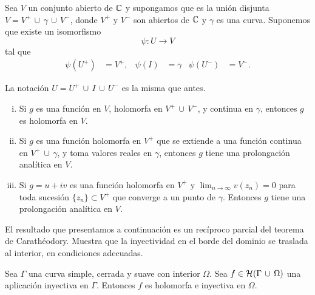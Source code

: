 \begin{theorem} Sea $V$ un conjunto abierto de $\mathbb{C}$ y supongamos que es la unión disjunta $V = V^+ \, \cup \, \gamma \, \cup \, V^-$, donde $V^+$ y $V^-$ son abiertos de $\mathbb{C}$ y $\gamma$ es una curva. Suponemos que existe un isomorfismo
    \begin{equation*}
        \psi: U \to V
    \end{equation*}
    tal que
    \begin{align*}
        \psi(U^+) &= V^+, & \psi(I) &= \gamma & \psi(U^-) &= V^-.
    \end{align*}

    La notación $U = U^+ \, \cup \, I \, \cup \, U^-$ es la misma que antes.

    \begin{enumerate}[(i)]
        \item Si $g$ es una función en $V$, holomorfa en $V^+ \, \cup \, V^-$, y continua en $\gamma$, entonces $g$ es holomorfa en $V$.

        \item Si $g$ es una función holomorfa en $V^+$ que se extiende a una función continua en $V^+ \, \cup \, \gamma$, y toma valores reales en $\gamma$, entonces $g$ tiene una prolongación analítica en $V$.

        \item Si $g = u + iv$ es una función holomorfa en $V^+$ y $\lim_{n \to \infty} v(z_n) = 0$ para toda sucesión $\{z_n\}\subset V^+$ que converge a un punto de $\gamma$. Entonces $g$ tiene una prolongación analítica en $V$.
    \end{enumerate}
\end{theorem}


El resultado que presentamos a continuación es un recíproco parcial del teorema de Carathéodory. Muestra que la inyectividad en el borde del dominio se traslada al interior, en condiciones adecuadas. \\

\begin{theorem}
    Sea $\Gamma$ una curva simple, cerrada y suave con interior $\Omega$. Sea $f \in \mathcal{H}(\Gamma \, \cup \, \Omega)$ una aplicación inyectiva en $\Gamma$. Entonces $f$ es holomorfa e inyectiva en $\Omega$. \\
\end{theorem}

